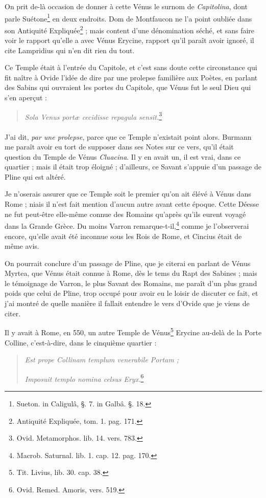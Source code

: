 \documentclass[a4paper, 11pt, oneside, polutonikogreek, french]{article}
\begin{document}
On prit de-là occasion de donner à cette Vénus le surnom de \emph{Capitolina}, dont parle Suétone\footnote{Sueton. in Caligulâ, §. 7. in Galbâ. §. 18.} en deux endroits. Dom de Montfaucon ne l'a point oubliée dans son Antiquité Expliquée\footnote{Antiquité Expliquée, tom. 1. pag. 171.} ; mais content d'une dénomination séché, et sans faire voir le rapport qu'elle a avec Vénus Erycine, rapport qu'il paraît avoir ignoré, il cite Lampridius qui n'en dit rien du tout.

Ce Temple était à l'entrée du Capitole, et c'est sans doute cette circonstance qui fit naître à Ovide l'idée de dire par une prolepse familière aux Poètes, en parlant des Sabins qui ouvraient les portes du Capitole, que Vénus fut le seul Dieu qui s'en aperçut :
\begin{quotation}
\emph{Sola Venus portæ cecidisse repagula sensit.}\footnote{Ovid. Metamorphos. lib. 14. vers. 783.}
\end{quotation}
\paragraph{}
J'ai dit, \emph{par une prolepse}, parce que ce Temple n'existait point alors. Burmann me paraît avoir eu tort de supposer dans ses Notes sur ce vers, qu'il était question du Temple de Vénus \emph{Cluacina}. Il y en avait un, il est vrai, dans ce quartier ; mais il était trop éloigné ; d'ailleurs, ce Savant s'appuie d'un passage de Pline qui est altéré.

Je n'oserais assurer que ce Temple soit le premier qu'on ait élévé à Vénus dans Rome ; niais il n'est fait mention d'aucun autre avant cette époque. Cette Déesse ne fut peut-être elle-même connue des Romains qu'après qu'ils eurent voyagé dans la Grande Grèce. Du moins Varron remarque-t-il,\footnote{Macrob. Saturnal. lib. 1. cap. 12. pag. 170.} comme je l'observerai encore, qu'elle avait été inconnue sous les Rois de Rome, et Cincius était de même avis.

On pourrait conclure d'un passage de Pline, que je citerai en parlant de Vénus Myrtea, que Vénus était connue à Rome, dès le tems du Rapt des Sabines ; mais le témoignage de Varron, le plus Savant des Romains, me paraît d'un plus grand poids que celui de Pline, trop occupé pour avoir eu le loisir de discuter ce fait, et j'ai montré de quelle manière il fallait entendre le vers d'Ovide que je viens de citer.

Il y avait à Rome, en 550, un autre Temple de Vénus\footnote{Tit. Livius, lib. 30. cap. 38.} Erycine au-delà de la Porte Colline, c'est-à-dire, dans le cinquième quartier :
\begin{quotation}
\emph{Est prope Collinam templum venerabile Portam ;}

\hspace*{5mm}\emph{Imposuit templo nomina celsus Eryx.}\footnote{Ovid. Remed. Amoris, vers. 519.}
\end{quotation}
\end{document}
